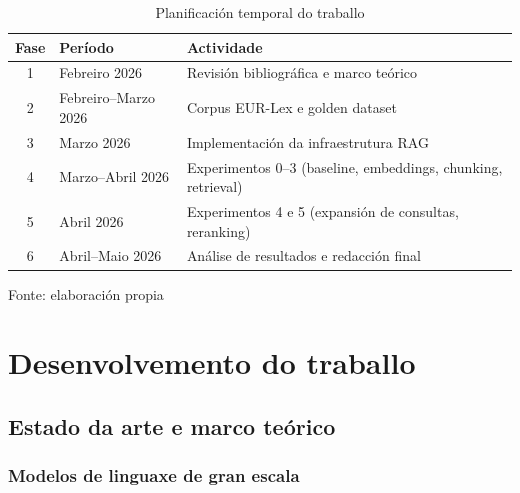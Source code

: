 \documentclass[11pt, a4paper, oneside]{report}
\newcommand{\fonte}[1]{%
  \par\smallskip
  {\centering\fontsize{9}{11}\selectfont Fonte: #1\par}}
\begin{document}
\begin{table}[H]
  \centering
  \caption{Planificación temporal do traballo}
  \label{tab:planificacion}
  \begin{tabular}{clp{}}
    \toprule
    \textbf{Fase} & \textbf{Período} & \textbf{Actividade} \\
    \midrule
    1 & Febreiro 2026       & Revisión bibliográfica e marco teórico \\
    2 & Febreiro--Marzo 2026 & Corpus EUR-Lex e golden dataset \\
    3 & Marzo 2026          & Implementación da infraestrutura RAG \\
    4 & Marzo--Abril 2026   & Experimentos 0--3 (baseline, embeddings, chunking, retrieval) \\
    5 & Abril 2026          & Experimentos 4 e 5 (expansión de consultas, reranking) \\
    6 & Abril--Maio 2026    & Análise de resultados e redacción final \\
    \bottomrule
  \end{tabular}
  \fonte{elaboración propia}
\end{table}

\clearpage

\chapter*{Desenvolvemento do traballo}

\setcounter{section}{0}

\section{Estado da arte e marco teórico}
\label{sec:estado_arte}

\subsection{Modelos de linguaxe de gran escala}
\label{sec:llm}
\end{document}

